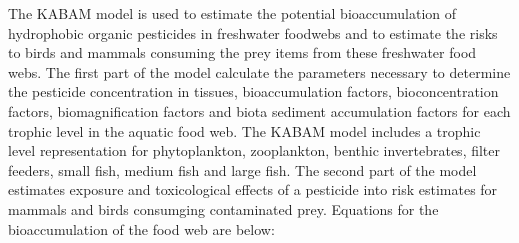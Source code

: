 \documentclass[10pt]{article}
\begin{document}
The KABAM model is used to estimate the potential bioaccumulation of hydrophobic organic pesticides in freshwater foodwebs and to estimate the risks to birds and mammals consuming the prey items from these freshwater food webs. The first part of the model calculate the parameters necessary to determine the pesticide concentration in tissues, bioaccumulation factors, bioconcentration factors, biomagnification factors and biota sediment accumulation factors for each trophic level in the aquatic food web. The KABAM model includes a trophic level representation for phytoplankton, zooplankton, benthic invertebrates, filter feeders, small fish, medium fish and large fish. The second part of the model estimates exposure and toxicological effects of a pesticide into risk estimates for mammals and birds consumging contaminated prey. Equations for the bioaccumulation of the food web are below:
\end{document}
